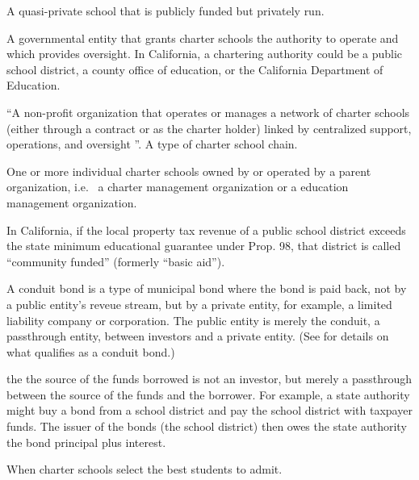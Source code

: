 \begin{description}[nosep]
\medskip\item[charter school] A quasi-private school that is publicly funded but privately run.

\medskip\item[chartering authority] A governmental entity that grants charter schools the authority to operate and which provides oversight. In California, a chartering authority could be a public school district, a county office of education, or the California Department of Education.

\medskip\item[charter management organization (CMO)] ``A non-profit organization that operates or manages a network of charter schools (either through a contract or as the charter holder) linked by centralized support, operations, and oversight \parencite{CDE2021b}''. A type of charter school chain.

\medskip\item[charter school chain] One or more individual charter schools owned by or operated by a parent organization, i.e.  a charter management organization or a education management organization.

\medskip\item[community funded] In California, if the local property tax revenue of a public school district exceeds the state minimum educational guarantee under Prop. 98, that district is called ``community funded'' (formerly ``basic aid'').

\medskip\item[conduit bond] A conduit bond is a type of municipal bond where the bond is paid back, not by a public entity's reveue stream, but by a private entity, for example, a limited liability company or corporation. The public entity is merely the conduit, a passthrough entity, between investors and a private entity. (See  for details on what qualifies as a conduit bond.) %

the the source of the funds borrowed is not an investor, but merely a passthrough between the source of the funds and the borrower. For example, a state authority might buy a bond from a school district and pay the school district with taxpayer funds. The issuer of the bonds (the school district) then owes the state authority the bond principal plus interest.

\medskip\item[cream skimming] When charter schools select the best students to admit.


\end{description}
